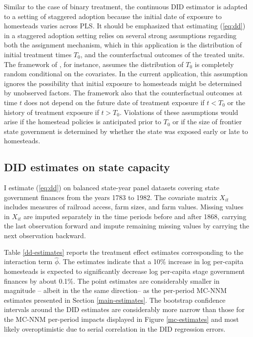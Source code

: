 \documentclass[12pt]{article}
\begin{document}
Similar to the case of binary treatment, the continuous DID estimator is adapted to a setting of staggered adoption because the initial date of exposure to homesteads varies across PLS. It should be emphasized that estimating (\ref{eq:dd}) in a staggered adoption setting relies on several strong assumptions regarding both the assignment mechanism, which in this application is the distribution of initial treatment times $T_0$, and the counterfactual outcomes of the treated units. The framework of \citet{athey2018design}, for instance, assumes the distribution of $T_0$ is completely random conditional on the covariates. In the current application, this assumption ignores the possibility that initial exposure to homesteads might be determined by unobserved factors. The framework also that the counterfactual outcomes at time $t$ does not depend on the future date of treatment exposure if $t < T_0$ or the history of treatment exposure if $t > T_0$. Violations of these assumptions would arise if the homestead policies is anticipated prior to $T_0$ or if the size of frontier state government is determined by whether the state was exposed early or late to homesteads. 

\subsection{DID estimates on state capacity}

I estimate (\ref{eq:dd}) on balanced state-year panel datasets covering state government finances from the years 1783 to 1982. The covariate matrix $X_{it}$ includes measures of railroad access, farm sizes, and farm values. Missing values in $X_{it}$ are imputed separately in the time periods before and after 1868, carrying the last observation forward and impute remaining missing values by carrying the next observation backward. 

Table \ref{dd-estimates} reports the treatment effect estimates corresponding to the interaction term $\hat{\phi}$. The estimates indicate that a 10\% increase in log per-capita homesteads is expected to significantly decrease log per-capita stage government finances by about 0.1\%. The point estimates are considerably smaller in magnitude -- albeit in the the same direction-- as the per-period MC-NNM estimates presented in Section \ref{main-estimates}. The bootstrap confidence intervals around the DID estimates are considerably more narrow than those for the MC-NNM per-period impacts displayed in Figure \ref{mc-estimates} and most likely overoptimistic due to serial correlation in the DID regression errors.
\end{document}
